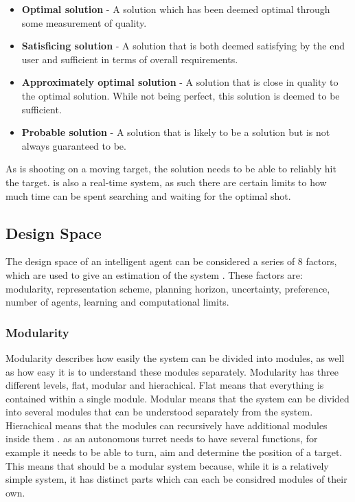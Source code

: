 \begin{itemize}
  \item \textbf{Optimal solution} - A solution which has been deemed optimal
  through some measurement of quality.
  \item \textbf{Satisficing solution} - A solution that is both deemed
  satisfying by the end user and sufficient in terms of overall requirements. 
  \item \textbf{Approximately optimal solution} - A solution that is close in
  quality to the optimal solution. While not being perfect, this solution is
  deemed to be sufficient.
  \item \textbf{Probable solution} - A solution that is likely to be a solution
  but is not always guaranteed to be.
\end{itemize}

As \name is shooting on a moving target, the solution needs to be able
to  reliably hit the target. \name is also a real-time system, as such there are
certain limits to how much time can be spent searching and waiting for the
optimal shot.

\subsection{Design Space}
The design space of an intelligent agent can be considered a series of 8
factors, which are used to give an estimation of the system \citep[ch.
1.5]{MIBook}\KT. These factors are: modularity, representation scheme, planning
horizon, uncertainty, preference, number of agents, learning and computational
limits.

\subsubsection{Modularity}
Modularity describes how easily the system can be divided into modules, as well
as how easy it is to understand these modules separately. Modularity has three
different levels, flat, modular and hierachical. Flat means that everything is
contained within a single module. Modular means that the system can be divided
into several modules that can be understood separately from the system.
Hierachical means that the modules can recursively have additional modules
inside them \citep[ch1.5.1]{MIBook}. \name as an autonomous turret needs to
have several functions, for example it needs to be able to turn, aim and determine the position of a target.
This means that \name should be a modular system because, while it is a
relatively simple system, it has distinct parts which can each be considred
modules of their own.

